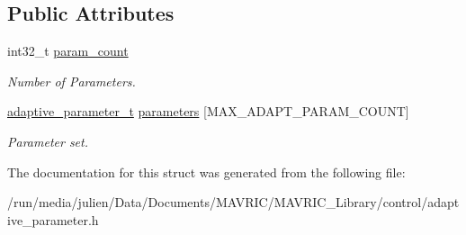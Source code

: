 \subsection*{Public Attributes}
\begin{DoxyCompactItemize}
\item 
\hypertarget{structadaptive__parameter__set__t_a8b4a7de7758b7bf3ff4e6b355a2fd8f2}{int32\+\_\+t \hyperlink{structadaptive__parameter__set__t_a8b4a7de7758b7bf3ff4e6b355a2fd8f2}{param\+\_\+count}}\label{structadaptive__parameter__set__t_a8b4a7de7758b7bf3ff4e6b355a2fd8f2}

\begin{DoxyCompactList}\small\item\em Number of Parameters. \end{DoxyCompactList}\item 
\hypertarget{structadaptive__parameter__set__t_a234d85b7ec2166ba853b1de2f2f82924}{\hyperlink{structadaptive__parameter__t}{adaptive\+\_\+parameter\+\_\+t} \hyperlink{structadaptive__parameter__set__t_a234d85b7ec2166ba853b1de2f2f82924}{parameters} \mbox{[}M\+A\+X\+\_\+\+A\+D\+A\+P\+T\+\_\+\+P\+A\+R\+A\+M\+\_\+\+C\+O\+U\+N\+T\mbox{]}}\label{structadaptive__parameter__set__t_a234d85b7ec2166ba853b1de2f2f82924}

\begin{DoxyCompactList}\small\item\em Parameter set. \end{DoxyCompactList}\end{DoxyCompactItemize}


The documentation for this struct was generated from the following file\+:\begin{DoxyCompactItemize}
\item 
/run/media/julien/\+Data/\+Documents/\+M\+A\+V\+R\+I\+C/\+M\+A\+V\+R\+I\+C\+\_\+\+Library/control/adaptive\+\_\+parameter.\+h\end{DoxyCompactItemize}
